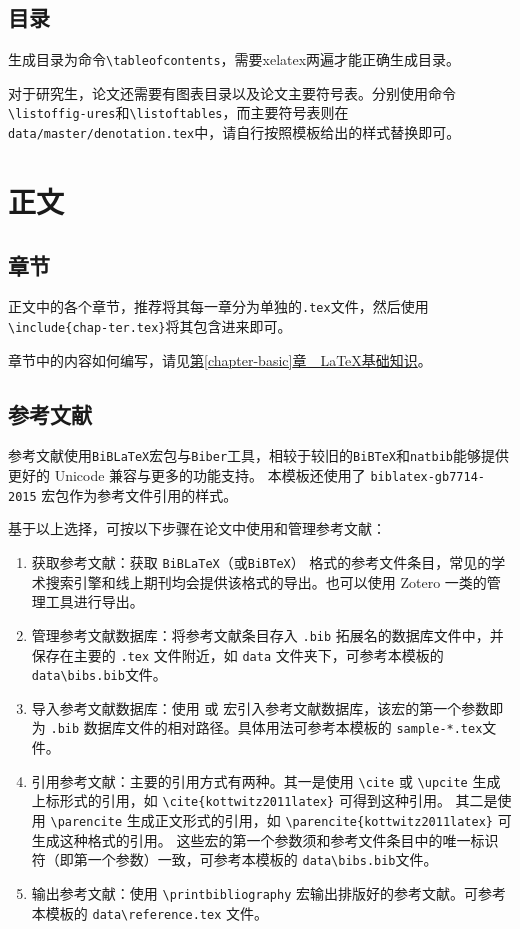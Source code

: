 \subsection{目录}
生成目录为命令\texttt{\textbackslash tableofcontents}，需要xelatex两遍才能正确生成目录。

对于研究生，论文还需要有图表目录以及论文主要符号表。分别使用命令\texttt{\textbackslash listoffig\hyp{}ures}和\texttt{\textbackslash listoftables}，而主要符号表则在\texttt{data/master/denotation.tex}中，请自行按照模板给出的样式替换即可。

\section{正文}
\subsection{章节}
正文中的各个章节，推荐将其每一章分为单独的\texttt{.tex}文件，然后使用\texttt{\textbackslash include\{chap\hyp{}ter.tex\}}将其包含进来即可。

章节中的内容如何编写，请见\hyperref[chapter-basic]{第\ref{chapter-basic}章~~\LaTeX{}基础知识}。

\subsection{参考文献}
参考文献使用\verb|BiBLaTeX|宏包与\verb|Biber|工具，相较于较旧的\verb|BiBTeX|和\verb|natbib|能够提供更好的 Unicode 兼容与更多的功能支持。
本模板还使用了 \verb|biblatex-gb7714-2015| 宏包作为参考文件引用的样式。

基于以上选择，可按以下步骤在论文中使用和管理参考文献：
\begin{enumerate}
    \item 获取参考文献：获取 \verb|BiBLaTeX|（或\verb|BiBTeX|） 格式的参考文件条目，常见的学术搜索引擎和线上期刊均会提供该格式的导出。也可以使用 Zotero 一类的管理工具进行导出。
    \item 管理参考文献数据库：将参考文献条目存入 \verb|.bib| 拓展名的数据库文件中，并保存在主要的 \verb|.tex| 文件附近，如 \verb|data| 文件夹下，可参考本模板的 \verb|data\bibs.bib|文件。
    \item 导入参考文献数据库：使用 \verb|| 或 \verb|| 宏引入参考文献数据库，该宏的第一个参数即为 \verb|.bib| 数据库文件的相对路径。具体用法可参考本模板的 \verb|sample-*.tex|文件。
    \item 引用参考文献：主要的引用方式有两种。其一是使用 \verb|\cite| 或 \verb|\upcite| 生成上标形式的引用，如 \verb|\cite{kottwitz2011latex}| 可得到这种\cite{kottwitz2011latex}引用。
        其二是使用 \verb|\parencite| 生成正文形式的引用，如 \verb|\parencite{kottwitz2011latex}| 可生成这种\parencite{kottwitz2011latex}格式的引用。
        这些宏的第一个参数须和参考文件条目中的唯一标识符（即第一个参数）一致，可参考本模板的 \verb|data\bibs.bib|文件。
    \item 输出参考文献：使用 \verb|\printbibliography| 宏输出排版好的参考文献。可参考本模板的 \verb|data\reference.tex| 文件。
\end{enumerate}

